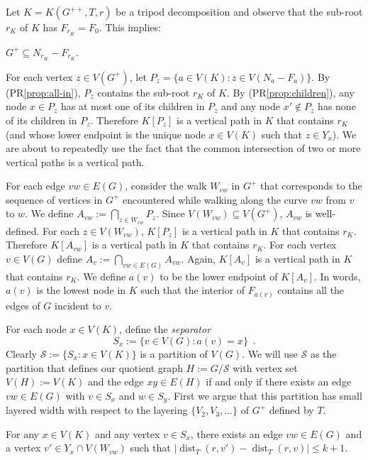 \documentclass{patmorin}
\DeclareMathOperator{\dist}{dist}
\renewcommand{\proplabel}[1]{\label{prop:#1}}
\renewcommand{\propref}[1]{(PR\ref{prop:#1})}
\begin{document}
Let $K=K(G^{++},T,r)$ be a tripod decomposition and observe that the sub-root $r_K$ of $K$ has $F_{r_K}=F_0$.  This implies:
\begin{compactenum}[(PR1)]\setcounter{enumi}{4}
  \item \proplabel{all-in}  $G^+\subseteq N_{r_K}-F_{r_K}$.
\end{compactenum}

For each vertex $z\in V(G^+)$, let $P_z=\{a\in V(K): z\in V(N_a-F_a)\}$.  By \propref{all-in}, $P_{z}$ contains the sub-root $r_K$ of $K$.  By \propref{children}, any node $x\in P_z$ has at most one of its children in $P_z$ and any node $x'\not\in P_z$ has none of its children in $P_z$.  Therefore $K[P_z]$ is a vertical path in $K$ that contains $r_K$ (and whose lower endpoint is the unique node $x\in V(K)$ such that $z\in Y_x$). We are about to repeatedly use the fact that the common intersection of two or more vertical paths is a vertical path. 

For each edge $vw\in E(G)$, consider the walk $W_{vw}$ in $G^+$ that corresponds to the sequence of vertices in $G^+$ encountered while walking along the curve $vw$ from $v$ to $w$. We define $A_{vw}:=\bigcap_{z\in W_{vw}} P_z$.  Since $V(W_{vw})\subseteq V(G^+)$, $A_{vw}$ is well-defined.  For each $z\in V(W_{vw})$, $K[P_{z}]$ is a vertical path in $K$ that contains $r_K$.   Therefore $K[A_{vw}]$ is a vertical path in $K$ that contains $r_K$.  For each vertex $v\in V(G)$ define $A_v:=\bigcap_{vw\in E(G)} A_{vw}$.  Again, $K[A_v]$ is a vertical path in $K$ that contains $r_K$.  We define $a(v)$ to be the lower endpoint of $K[A_v]$.  In words, $a(v)$ is the lowest node in $K$ such that the interior of $F_{a(v)}$ contains all the edges of $G$ incident to $v$.

For each node $x\in V(K)$, define the \emph{separator}
\[
   S_x := \{v\in V(G): a(v)=x \} \enspace .
\]
Clearly $\mathcal{S}:=\{S_x:x\in V(K)\}$ is a partition of $V(G)$.  We will use $\mathcal{S}$ as the partition that defines our quotient graph $H:=G/\mathcal{S}$ with vertex set $V(H):=V(K)$ and the edge $xy\in E(H)$ if and only if there exists an edge $vw\in E(G)$ with $v\in S_x$ and $w\in S_y$.  First we argue that this partition has small layered width with respect to the layering $\{V_2,V_3,\ldots\}$ of $G^+$ defined by $T$.

\begin{clm}
   For any $x\in V(K)$ and any vertex $v\in S_x$, there exists an edge $vw\in E(G)$ and a vertex $v'\in Y_x\cap V(W_{vw})$ such that $|\dist_T(r,v')-\dist_T(r,v)|\le k+1$.
\end{clm}
\end{document}
